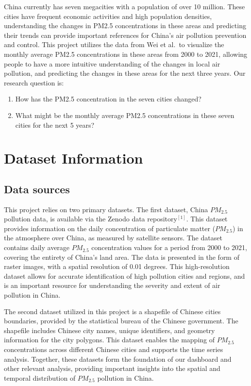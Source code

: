 \documentclass[
  12pt,
]{article}
\providecommand{\tightlist}{%
  \setlength{\itemsep}{0pt}\setlength{\parskip}{0pt}}
\begin{document}
China currently has seven megacities with a population of over 10
million. These cities have frequent economic activities and high
population densities, understanding the changes in PM2.5 concentrations
in these areas and predicting their trends can provide important
references for China's air pollution prevention and control. This
project utilizes the data from Wei et al.~to visualize the monthly
average PM2.5 concentrations in these areas from 2000 to 2021, allowing
people to have a more intuitive understanding of the changes in local
air pollution, and predicting the changes in these areas for the next
three years. Our research question is:

\begin{enumerate}
\def\labelenumi{\arabic{enumi}.}
\tightlist
\item
  How has the PM2.5 concentration in the seven cities changed?
\item
  What might be the monthly average PM2.5 concentrations in these seven
  cities for the next 5 years?
\end{enumerate}

\newpage

\hypertarget{dataset-information}{%
\section{Dataset Information}\label{dataset-information}}

\hypertarget{data-sources}{%
\subsection{Data sources}\label{data-sources}}

This project relies on two primary datasets. The first dataset, China
\(PM_{2.5}\) pollution data, is available via the Zenodo data
repository\(^{[1]}\). This dataset provides information on the daily
concentration of particulate matter (\(PM_{2.5}\)) in the atmosphere
over China, as measured by satellite sensors. The dataset contains daily
average \(PM_{2.5}\) concentration values for a period from 2000 to
2021, covering the entirety of China's land area. The data is presented
in the form of raster images, with a spatial resolution of 0.01 degrees.
This high-resolution dataset allows for accurate identification of high
pollution cities and regions, and is an important resource for
understanding the severity and extent of air pollution in China.

The second dataset utilized in this project is a shapefile of Chinese
cities boundaries, provided by the statistical bureau of the Chinese
government. The shapefile includes Chinese city names, unique
identifiers, and geometry information for the city polygons. This
dataset enables the mapping of \(PM_{2.5}\) concentrations across
different Chinese cities and supports the time series analysis.
Together, these datasets form the foundation of our dashboard and other
relevant analysis, providing important insights into the spatial and
temporal distribution of \(PM_{2.5}\) pollution in China.
\end{document}
